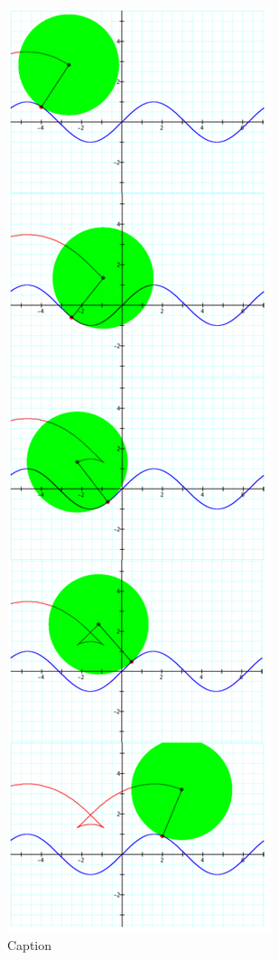 {\begin{figure}[H]
\begin{minipage}[b]{\w}
      \includegraphics[width=\fw, height=\fh, keepaspectratio]{img/09-crunch/03.png}
      \caption{Caption}
      \vspace{4ex}
    \end{minipage} %

\end{figure}}
